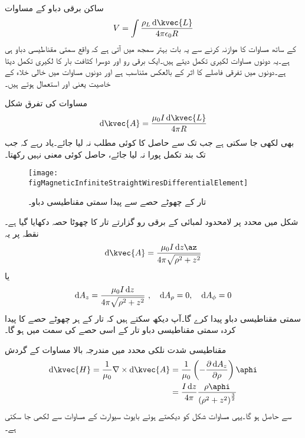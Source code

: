 ساکن برقی دباو کے مساوات
\begin{align*}
V=\int \frac{\rho_L \dif \kvec{L}}{4\pi \epsilon_0 R}
\end{align*}
کے ساتھ مساوات کا موازنہ کرنے سے یہ بات بہتر سمجھ میں آتی ہے کہ  واقع سمتی مقناطیسی دباو ہی ہے۔یہ دونوں مساوات لکیری تکمل دیتے ہیں۔ایک برقی رو اور دوسرا کثافت بار کا لکیری تکمل دیتا ہے۔دونوں میں تفرقی فاصلے  کا اثر  کے بالعکس متناسب ہے اور دونوں مساوات میں خالی خلاء کے خاصیت یعنی  اور  استعمال ہوتے ہیں۔

مساوات  کی تفرق شکل
\begin{align}\label{مساوات_مقناطیسی_سمتی_دباو_تفرق_شکل}
\dif \kvec{A}=\frac{\mu_0 I \dif \kvec{L}}{4\pi R}
\end{align}
بھی لکھی جا سکتی ہے جب تک  سے حاصل  کا کوئی مطلب نہ لیا جائے۔یاد رہے کہ جب تک بند تکمل پورا نہ لیا جائے، حاصل  کوئی معنی نہیں رکھتا۔
\begin{figure}
\centering
\texttt{[image: figMagneticInfiniteStraightWiresDifferentialElement]}
\caption{تار کے چھوٹے حصے سے پیدا سمتی مقناطیسی دباو۔}
\label{شکل_مقناطیسی_سمتی_مقناطیسی_دباو_تفرق_حصہ}
\end{figure}

شکل  میں  محدد پر لامحدود لمبائی کے برقی رو گزارتے تار کا چھوٹا حصہ  دکھایا گیا ہے۔نقطہ  پر یہ
\begin{align*}
\dif \kvec{A}=\frac{\mu_0 I \dif z \az}{4\pi \sqrt{\rho^2+z^2}}
\end{align*}
یا
\begin{align}
\dif  A_z=\frac{\mu_0 I \dif z}{4\pi \sqrt{\rho^2+z^2}} \,\, , \quad \dif A_\rho=0, \quad \dif A_\phi=0
\end{align}
سمتی مقناطیسی دباو پیدا کرے گا۔آپ دیکھ سکتے ہیں کہ تار کے ہر چھوٹے حصے کا پیدا کردہ سمتی مقناطیسی دباو تار کے اسی حصے کی سمت میں ہو گا۔

مقناطیسی شدت  نلکی محدد میں مندرجہ بالا مساوات کے گردش
\begin{align*}
\dif \kvec{H}=\frac{1}{\mu_0} \nabla \times \dif \kvec{A}&=\frac{1}{\mu_0} \left(-\frac{\partial \dif A_z}{\partial \rho} \right)\aphi\\
&=\frac{I \dif z}{4\pi} \frac{\rho \aphi}{\left(\rho^2+z^2 \right)^{\frac{3}{2}}}
\end{align*}
 سے حاصل ہو گا۔یہی مساوات شکل  کو دیکھتے ہوئے بایوٹ سیوارٹ کے مساوات سے لکھی جا سکتی ہے۔

